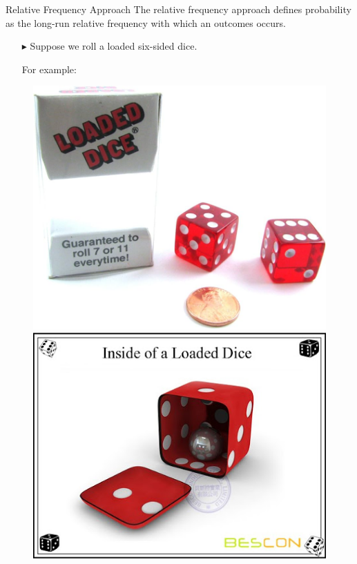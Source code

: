 \documentclass[12pt]{beamer}
\begin{document}
\begin{frame}{Relative Frequency Approach}
	The relative frequency approach defines probability as the long-run relative frequency with which an outcomes occurs.
	\begin{itemize}
		\item[$\blacktriangleright$] Suppose we roll a {\color{red}loaded} six-sided dice.
		
		For example:
	\end{itemize}
\begin{figure}[htbp]
	\centering
	\begin{minipage}{0.4\textwidth}
		\centering
		\includegraphics[width=\textwidth]{dice.jpg}
	\end{minipage}\hfill
	\begin{minipage}{0.45\textwidth}
		\centering
		\includegraphics[width=\textwidth]{loaded2.jpg}
	\end{minipage}
\end{figure}
\end{frame}
\end{document}

